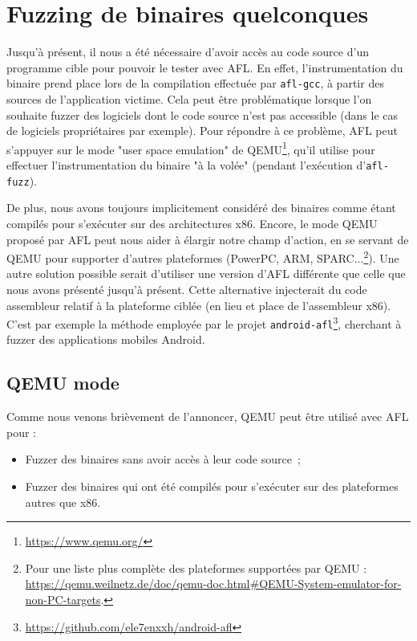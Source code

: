 \chapter{Fuzzing de binaires quelconques}

Jusqu'à présent, il nous a été nécessaire d'avoir accès au code source d'un programme cible pour pouvoir le tester avec AFL.
En effet, l'instrumentation du binaire prend place lors de la compilation effectuée par \lstinline{afl-gcc}, à partir des sources de l'application victime.
Cela peut être problématique lorsque l'on souhaite fuzzer des logiciels dont le code source n'est pas accessible (dans le cas de logiciels propriétaires par exemple).
Pour répondre à ce problème, AFL peut s'appuyer sur le mode "user space emulation" de QEMU\footnote{\url{https://www.qemu.org/}}, qu'il utilise pour effectuer l'instrumentation du binaire "à la volée" (pendant l'exécution d'\lstinline{afl-fuzz}).

De plus, nous avons toujours implicitement considéré des binaires comme étant compilés pour s'exécuter sur des architectures x86.
Encore, le mode QEMU proposé par AFL peut nous aider à élargir notre champ d'action, en se servant de QEMU pour supporter d'autres plateformes (PowerPC, ARM, SPARC...\footnote{Pour une liste plus complète des plateformes supportées par QEMU : \url{https://qemu.weilnetz.de/doc/qemu-doc.html\#QEMU-System-emulator-for-non-PC-targets}.}).
Une autre solution possible serait d'utiliser une version d'AFL différente que celle que nous avons présenté jusqu'à présent.
Cette alternative injecterait du code assembleur relatif à la plateforme ciblée (en lieu et place de l'assembleur x86).
C'est par exemple la méthode employée par le projet \lstinline{android-afl}\footnote{\url{https://github.com/ele7enxxh/android-afl}}, cherchant à fuzzer des applications mobiles Android.

\section{QEMU mode}

Comme nous venons brièvement de l'annoncer, QEMU peut être utilisé avec AFL pour :
\begin{itemize}
  \item{} Fuzzer des binaires sans avoir accès à leur code source ;
  \item{} Fuzzer des binaires qui ont été compilés pour s'exécuter sur des plateformes autres que x86.
\end{itemize}

